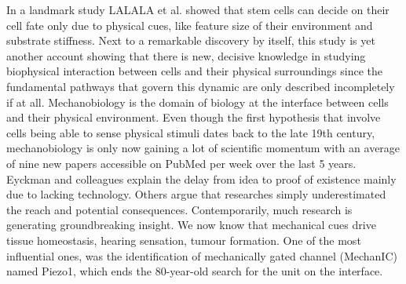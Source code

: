 In a landmark study LALALA et al. showed that stem cells can decide on their cell fate only due to physical cues, like feature size of their environment and substrate stiffness. Next to a remarkable discovery by itself, this study is yet another account showing that there is new, decisive knowledge in studying biophysical interaction between cells and their physical surroundings since the fundamental pathways that govern this dynamic are only described incompletely if at all. Mechanobiology is the domain of biology at the interface between cells and their physical environment. Even though the first hypothesis that involve cells being able to sense physical stimuli dates back to the late 19th century, mechanobiology is only now gaining a lot of scientific momentum with an average of nine new papers accessible on PubMed per week over the last 5 years. Eyckman and colleagues explain the delay from idea to proof of existence mainly due to lacking technology. Others argue that researches simply underestimated the reach and potential consequences. Contemporarily, much research is generating groundbreaking insight. We now know that mechanical cues drive tissue homeostasis, hearing sensation, tumour formation.  One of the most influential ones, was the identification of mechanically gated channel (MechanIC) named Piezo1, which ends the 80-year-old search for the unit on the interface.
